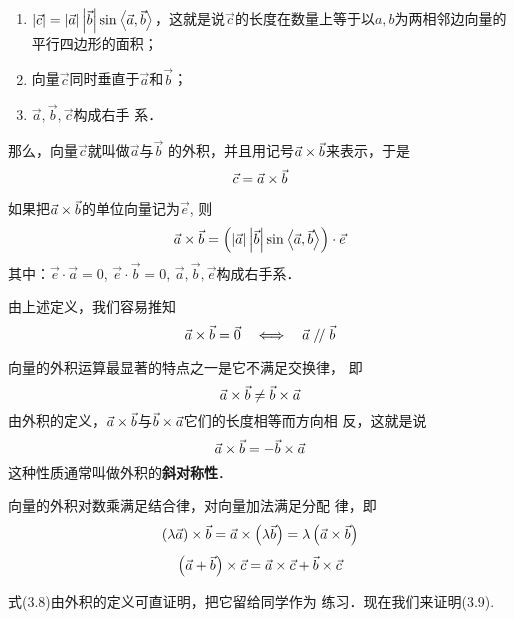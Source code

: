 \begin{enumerate}
    \item $|\vec{c}|=|\vec{a}|\left|\vec{b}\right|\sin\left\langle \vec{a},\vec{b} \right\rangle$，这就是说$\vec{c}$的长度在数量上等于以$a,b$为两相邻边向量的平行四边形的面积；
    \item 向量$\vec{c}$同时垂直于$\vec{a}$和$\vec{b}$；
    \item $\vec{a},\vec{b},\vec{c}$构成右手
    系．
\end{enumerate}

那么，向量$\vec{c}$就叫做$\vec{a}$与$\vec{b}$
的外积，并且用记号$\vec{a}\times\vec{b}$来表示，于是
\[\vec{c}=\vec{a}\times \vec{b}\]

如果把$\vec{a}\times \vec{b}$的单位向量记为$\vec{e}$, 则
\[\vec{a}\times \vec{b}=\left(|\vec{a}|\left|\vec{b}\right|\sin\left\langle \vec{a},\vec{b} \right\rangle\right)\cdot \vec{e}\]
其中：$\vec{e}\cdot \vec{a}=0$, $\vec{e}\cdot \vec{b}=0$, $\vec{a},\vec{b},\vec{e}$构成右手系．

由上述定义，我们容易推知
\[\vec{a}\times \vec{b}=\vec{0}\quad \Longleftrightarrow\quad  \vec{a}\mathrel{/\mskip-2.5mu/} \vec{b}\]

向量的外积运算最显著的特点之一是它不满足交换律，
即
\[\vec{a}\times \vec{b}\ne \vec{b}\times \vec{a}\]
由外积的定义，$\vec{a}\times \vec{b}$与$\vec{b}\times \vec{a}$它们的长度相等而方向相
反，这就是说
\begin{equation}
    \vec{a}\times \vec{b}=-\vec{b}\times \vec{a}
\end{equation}
这种性质通常叫做外积的\textbf{斜对称性}．

向量的外积对数乘满足结合律，对向量加法满足分配
律，即
\begin{equation}
    \left(\lambda\vec{a}\right)\times \vec{b}=\vec{a}\times \left(\lambda\vec{b}\right)=\lambda\left(\vec{a}\times \vec{b}\right)
\end{equation}
\begin{equation}
    \left(\vec{a}+\vec{b}\right)\times \vec{c}=\vec{a}\times \vec{c}+\vec{b}\times \vec{c}
\end{equation}

式(3.8)由外积的定义可直证明，把它留给同学作为
练习．现在我们来证明(3.9).

